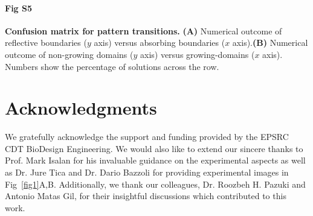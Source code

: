 \documentclass[10pt,letterpaper]{article}
\begin{document}
\paragraph*{Fig S5}
\label{sup_fig5}
{\bf Confusion matrix for pattern transitions.} \textbf{(A)} Numerical outcome of reflective boundaries ($y$ axis) versus absorbing boundaries ($x$ axis).\textbf{(B)} Numerical outcome of non-growing domains ($y$ axis) versus growing-domains ($x$ axis). Numbers show the percentage of solutions across the row.


\section*{Acknowledgments}
We gratefully acknowledge the support and funding provided by the EPSRC CDT BioDesign Engineering. We would also like to extend our sincere thanks to Prof. Mark Isalan for his invaluable guidance on the experimental aspects as well as Dr. Jure Tica and Dr. Dario Bazzoli for providing experimental images in Fig~\ref{fig1}A,B. Additionally, we thank our colleagues, Dr. Roozbeh H. Pazuki
 and Antonio Matas Gil, for their insightful discussions which contributed to this work.

\printbibliography[heading=bibintoc]

%
%
%
%
%


\printbibliography[heading=bibintoc]
\end{document}
